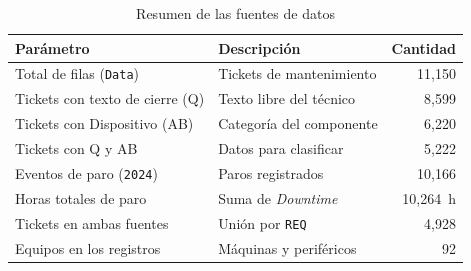 \documentclass[conference]{IEEEtran}
\begin{document}
\begin{table}[htbp]
\caption{Resumen de las fuentes de datos}
\label{tab:dataset_summary}
\begin{center}
\begin{tabularx}{\columnwidth}{lXr}
\toprule
\textbf{Parámetro} & \textbf{Descripción} & \textbf{Cantidad} \\
\midrule
Total de filas (\texttt{Data}) & Tickets de mantenimiento & 11,150 \\
Tickets con texto de cierre (Q) & Texto libre del técnico & 8,599 \\
Tickets con Dispositivo (AB) & Categoría del componente & 6,220 \\
Tickets con Q y AB & Datos para clasificar & 5,222 \\
Eventos de paro (\texttt{2024}) & Paros registrados & 10,166 \\
Horas totales de paro & Suma de \textit{Downtime} & 10,264~h \\
Tickets en ambas fuentes & Unión por \texttt{REQ} & 4,928 \\
Equipos en los registros & Máquinas y periféricos & 92 \\
\bottomrule
\end{tabularx}
\end{center}
\end{table}
\end{document}
